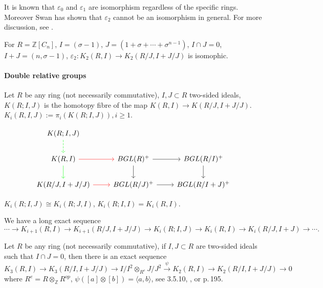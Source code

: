 \begin{remark}
	It is known that $\varepsilon_0$ and $\varepsilon_1$ are isomorphism regardless of the specific rings. Moreover  Swan \cite{SWAN1971221} has shown  that  $\varepsilon_2$  cannot be an isomorphism in general. For more discussion, see \cite{STEIN1980213}.
\end{remark}
For $R=\mathbb{Z}[C_n]$, $I=(\sigma-1)$, $J=(1+\sigma+\cdots +\sigma^{n-1})$, $I\cap J=0$, $I+J=(n,\sigma-1)$, $\varepsilon_2\colon K_2(R,I)\longrightarrow K_2(R/J,I+J/J)$ is isomophic.
\paragraph{Double relative groups} %
\label{par:double_relative_groups}



\begin{definition}
	Let $R$ be any ring (not necessarily commutative), $I,J\subset R$ two-sided ideals, $K(R;I,J)$ is the homotopy fibre of the map $K(R,I)\longrightarrow K(R/J,I+J/J)$. $K_i(R,I,J):=\pi_i(K(R;I,J)), i\geq 1$.
\end{definition}
\[
\begin{tikzcd}
	K(R;I,J) \ar[d, green, dashed] & & \\
	K(R,I) \ar[r,red] \ar[d, green] & BGL(R)^+ \ar[r] \ar[d] &BGL(R/I)^+ \ar[d] \\
	K(R/J,I+J/J) \ar[r,red]  & BGL(R/J)^+ \ar[r]  &BGL(R/I+J)^+ 
\end{tikzcd}\]
\begin{remark}
	$K_i(R;I,J)\cong K_i(R;J,I)$, $K_i(R;I,I)=K_i(R,I)$.
\end{remark}
We have a long exact sequence 
\[\cdots \longrightarrow K_{i+1}(R,I)\longrightarrow K_{i+1}(R/J,I+J/J) \longrightarrow K_i(R;I,J)\longrightarrow K_i(R,I)\longrightarrow K_i(R/J,I+J)\longrightarrow \cdots.\]



Let $R$ be any ring (not necessarily commutative), if $I,J\subset R$ are two-sided ideals such that $I\cap J =0$, then there is an exact sequence
\[K_3(R,I) \longrightarrow K_3(R/I,I+J/J)\longrightarrow I/I^2\otimes_{R^e}J/J^2\overset{\psi}{\longrightarrow}K_2(R,I)\longrightarrow K_2(R/I,I+J/J)\longrightarrow 0\]
where $R^e= R\otimes_{\mathbb{Z}}R^{op}$, $\psi([a]\otimes [b])=\langle a, b\rangle$, see \cite{weibel2013k} 3.5.10, \cite{STEIN1980213}, \cite{Keune1978The} or \cite{friedlander1981algebraic} p.\,195.

